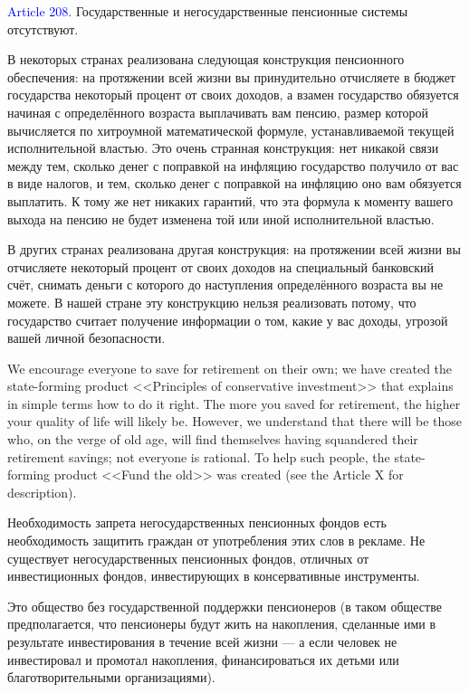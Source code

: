 \documentclass[11pt]{article}
\theoremstyle{remark}
\theoremstyle{definition}
\begin{document}
\color{blue}





\color{black}


\textcolor{blue}{Article 208.} Государственные и негосударственные пенсионные системы отсутствуют. 


\color{blue}



В некоторых странах реализована следующая конструкция пенсионного обеспечения: на протяжении всей жизни вы принудительно отчисляете в бюджет государства некоторый процент от своих доходов, а взамен государство обязуется начиная с определённого возраста выплачивать вам пенсию, размер которой вычисляется по хитроумной математической формуле, устанавливаемой текущей исполнительной властью. Это очень странная конструкция: нет никакой связи между тем, сколько денег с поправкой на инфляцию государство получило от вас в виде налогов, и тем, сколько денег с поправкой на инфляцию оно вам обязуется выплатить. К тому же нет никаких гарантий, что эта формула к моменту вашего выхода на пенсию не будет изменена той или иной исполнительной властью.

В других странах реализована другая конструкция: на протяжении всей жизни вы отчисляете некоторый процент от своих доходов на специальный банковский счёт, снимать деньги с которого до наступления определённого возраста вы не можете. В нашей стране эту конструкцию нельзя реализовать потому, что государство считает получение информации о том, какие у вас доходы, угрозой вашей личной безопасности.


We encourage everyone to save for retirement on their own; we have created the state-forming product <<Principles of conservative investment>> that explains in simple terms how to do it right. The more you saved for retirement, the higher your quality of life will likely be. However, we understand that there will be those who, on the verge of old age, will find themselves having squandered their retirement savings; not everyone is rational. To help such people, the state-forming product <<Fund the old>> was created (see the Article X for description).


Необходимость запрета негосударственных пенсионных фондов есть необходимость защитить граждан от употребления этих слов в рекламе. Не существует негосударственных пенсионных фондов, отличных от инвестиционных фондов, инвестирующих в консервативные инструменты.

Это общество без государственной поддержки пенсионеров (в таком обществе предполагается, что пенсионеры будут жить на накопления, сделанные ими в результате инвестирования в течение всей жизни --- а если человек не инвестировал и промотал накопления, финансироваться их детьми или благотворительными организациями). 
\end{document}
